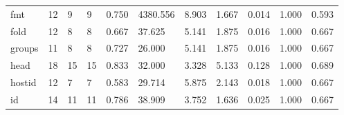 \begin{longtable}{lp{1.8cm}p{1.8cm}p{1.8cm}p{1.8cm}p{1.8cm}p{1.8cm}p{1.8cm}p{1.8cm}p{1.8cm}p{1.8cm}}
fmt       &                           12 &                  9 &                                 9 &                                      0.750 &                               4380.556 &                                        8.903 &                             1.667 &                                   0.014 &                              1.000 &                                              0.593 \\
fold      &                           12 &                  8 &                                 8 &                                      0.667 &                                 37.625 &                                        5.141 &                             1.875 &                                   0.016 &                              1.000 &                                              0.667 \\
groups    &                           11 &                  8 &                                 8 &                                      0.727 &                                 26.000 &                                        5.141 &                             1.875 &                                   0.016 &                              1.000 &                                              0.667 \\
head      &                           18 &                 15 &                                15 &                                      0.833 &                                 32.000 &                                        3.328 &                             5.133 &                                   0.128 &                              1.000 &                                              0.689 \\
hostid    &                           12 &                  7 &                                 7 &                                      0.583 &                                 29.714 &                                        5.875 &                             2.143 &                                   0.018 &                              1.000 &                                              0.667 \\
id        &                           14 &                 11 &                                11 &                                      0.786 &                                 38.909 &                                        3.752 &                             1.636 &                                   0.025 &                              1.000 &                                              0.667 \\

\end{longtable}
